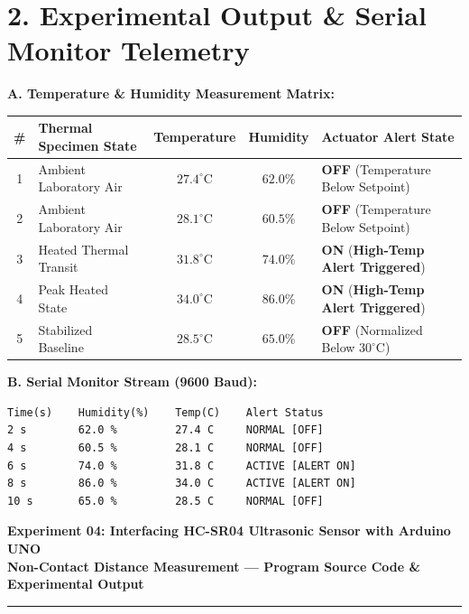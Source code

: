 \documentclass[10pt,a4paper]{article}
\begin{document}
\vspace{0.06cm}
\section*{2. Experimental Output \& Serial Monitor Telemetry}

\noindent
\textbf{A. Temperature \& Humidity Measurement Matrix:}\par\vspace{0.06cm}
{\footnotesize
\setlength{\tabcolsep}{6pt}
\renewcommand{\arraystretch}{1.18}
\begin{tabularx}{\textwidth}{|c|p{4.2cm}|c|c|X|}
\hline
\textbf{\#} & \textbf{Thermal Specimen State} & \textbf{Temperature} & \textbf{Humidity} & \textbf{Actuator Alert State} \\
\hline
1 & Ambient Laboratory Air & $27.4^\circ\text{C}$ & $62.0\%$ & \textbf{OFF} (Temperature Below Setpoint) \\
2 & Ambient Laboratory Air & $28.1^\circ\text{C}$ & $60.5\%$ & \textbf{OFF} (Temperature Below Setpoint) \\
3 & Heated Thermal Transit & $31.8^\circ\text{C}$ & $74.0\%$ & \textbf{ON} (\textbf{High-Temp Alert Triggered}) \\
4 & Peak Heated State & $34.0^\circ\text{C}$ & $86.0\%$ & \textbf{ON} (\textbf{High-Temp Alert Triggered}) \\
5 & Stabilized Baseline & $28.5^\circ\text{C}$ & $65.0\%$ & \textbf{OFF} (Normalized Below $30^\circ\text{C}$) \\
\hline
\end{tabularx}
}

\vspace{0.22cm}

\noindent
\textbf{B. Serial Monitor Stream (9600 Baud):}\par\vspace{0.05cm}
\begin{lstlisting}[style=bwTerminal]
Time(s)    Humidity(%)    Temp(C)    Alert Status
2 s        62.0 %         27.4 C     NORMAL [OFF]
4 s        60.5 %         28.1 C     NORMAL [OFF]
6 s        74.0 %         31.8 C     ACTIVE [ALERT ON]
8 s        86.0 %         34.0 C     ACTIVE [ALERT ON]
10 s       65.0 %         28.5 C     NORMAL [OFF]
\end{lstlisting}

\newpage

\begin{center}
    {\large\bfseries Experiment 04: Interfacing HC-SR04 Ultrasonic Sensor with Arduino UNO}\\[0.08cm]
    {\normalsize\textbf{Non-Contact Distance Measurement --- Program Source Code \& Experimental Output}}
\end{center}
\vspace{-0.22cm}
\rule{\textwidth}{0.8pt}
\vspace{0.08cm}
\end{document}
